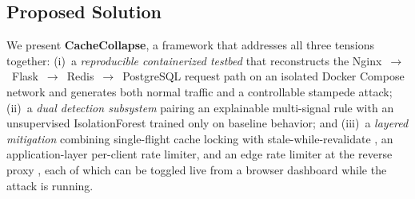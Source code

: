 \documentclass[preprint,12pt]{elsarticle}
\begin{document}
\subsection{Proposed Solution}
We present \textbf{CacheCollapse}, a framework that addresses all three tensions
together:
(i)~a \emph{reproducible containerized testbed} that reconstructs the
Nginx~$\rightarrow$~Flask~$\rightarrow$~Redis~$\rightarrow$~PostgreSQL request path on
an isolated Docker Compose network \cite{merkel2014,dockercompose} and generates both
normal traffic and a controllable stampede attack;
(ii)~a \emph{dual detection subsystem} pairing an explainable multi-signal rule with
an unsupervised IsolationForest \cite{liu2008,liu2012} trained only on baseline
behavior; and
(iii)~a \emph{layered mitigation} combining single-flight cache locking with
stale-while-revalidate \cite{nishtala2013,rfc5861}, an application-layer per-client
rate limiter, and an edge rate limiter at the reverse proxy \cite{nginxlimitreq}, each
of which can be toggled live from a browser dashboard while the attack is running.
\end{document}
